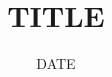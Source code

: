 \documentclass[12pt,letterpaper,answers,initials]{test}
\title{TITLE}
\date{DATE}
\begin{document}
  \begin{questions}
  \end{questions}
\end{document}
